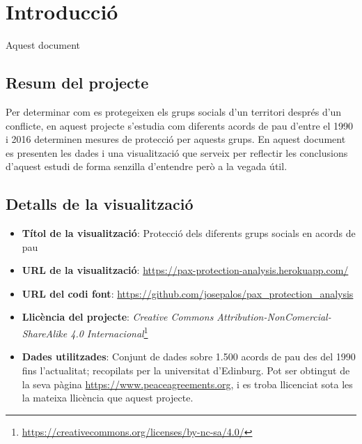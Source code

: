 \documentclass{article}
\title{\large \subject \\ \activity}
\author{Josep Alòs Pascual}
\date{\today}
\begin{document}
\maketitle

\section{Introducció}
Aquest document %

\subsection{Resum del projecte}
Per determinar com es protegeixen els grups socials d’un territori després d’un
conflicte, en aquest projecte s’estudia com diferents acords de pau d’entre el
1990 i 2016 determinen mesures de protecció per aquests grups. En aquest
document es presenten les dades i una visualització que serveix per reflectir
les conclusions d’aquest estudi de forma senzilla d’entendre però a la vegada
útil.

\subsection{Detalls de la visualització}
\begin{itemize}
    \item \textbf{Títol de la visualització}: Protecció dels diferents grups
        socials en acords de pau
    \item \textbf{URL de la visualització}: \url{https://pax-protection-analysis.herokuapp.com/}
    \item \textbf{URL del codi font}: \url{https://github.com/josepalos/pax_protection_analysis}
    \item \textbf{Llicència del projecte}: \textit{Creative Commons Attribution-NonComercial-ShareAlike 4.0
        Internacional}\footnote{\url{https://creativecommons.org/licenses/by-nc-sa/4.0/}}
    \item \textbf{Dades utilitzades}: Conjunt de dades sobre 1.500 acords de pau
        des del 1990 fins l'actualitat; recopilats
        per la universitat d'Edinburg. Pot ser obtingut de la seva pàgina
        \url{https://www.peaceagreements.org}, i es troba llicenciat sota les
        la mateixa llicència que aquest projecte.
\end{itemize}
\end{document}
